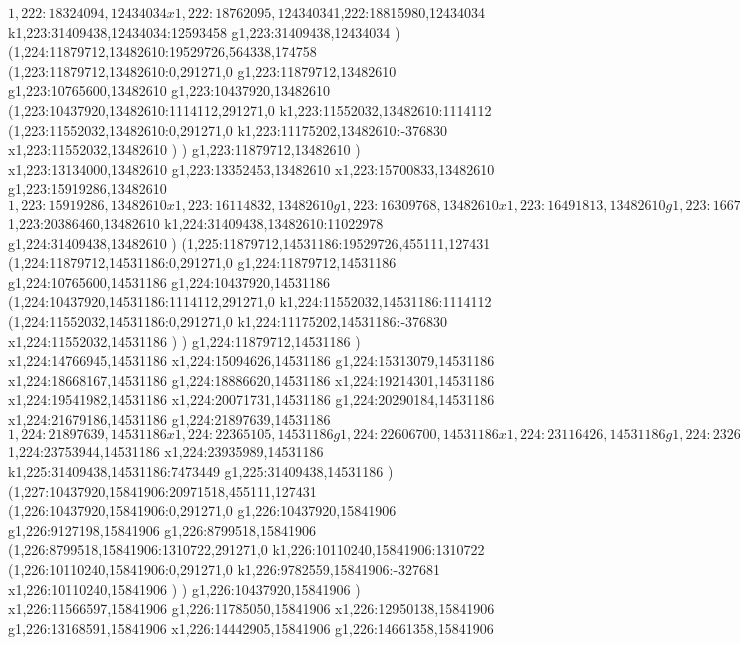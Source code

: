 {$1,222:18324094,12434034
x1,222:18762095,12434034
$1,222:18815980,12434034
k1,223:31409438,12434034:12593458
g1,223:31409438,12434034
)
(1,224:11879712,13482610:19529726,564338,174758
(1,223:11879712,13482610:0,291271,0
g1,223:11879712,13482610
g1,223:10765600,13482610
g1,223:10437920,13482610
(1,223:10437920,13482610:1114112,291271,0
k1,223:11552032,13482610:1114112
(1,223:11552032,13482610:0,291271,0
k1,223:11175202,13482610:-376830
x1,223:11552032,13482610
)
)
g1,223:11879712,13482610
)
x1,223:13134000,13482610
g1,223:13352453,13482610
x1,223:15700833,13482610
g1,223:15919286,13482610
$1,223:15919286,13482610
x1,223:16114832,13482610
g1,223:16309768,13482610
x1,223:16491813,13482610
g1,223:16673853,13482610
x1,223:17111854,13482610
g1,223:17311371,13482610
x1,223:17821097,13482610
g1,223:17966729,13482610
x1,223:18404730,13482610
g1,223:18640655,13482610
x1,223:19296016,13482610
g1,223:19478056,13482610
x1,223:19951372,13482610
[1,223:19951372,13657368:435088,739096,0
(1,223:19951372,13202262:435088,283990,54614
x1,223:20353692,13202262
)
(1,223:19951372,13657368:294003,295640,0
x1,223:20212607,13657368
)
]
$1,223:20386460,13482610
k1,224:31409438,13482610:11022978
g1,224:31409438,13482610
)
(1,225:11879712,14531186:19529726,455111,127431
(1,224:11879712,14531186:0,291271,0
g1,224:11879712,14531186
g1,224:10765600,14531186
g1,224:10437920,14531186
(1,224:10437920,14531186:1114112,291271,0
k1,224:11552032,14531186:1114112
(1,224:11552032,14531186:0,291271,0
k1,224:11175202,14531186:-376830
x1,224:11552032,14531186
)
)
g1,224:11879712,14531186
)
x1,224:14766945,14531186
x1,224:15094626,14531186
g1,224:15313079,14531186
x1,224:18668167,14531186
g1,224:18886620,14531186
x1,224:19214301,14531186
x1,224:19541982,14531186
x1,224:20071731,14531186
g1,224:20290184,14531186
x1,224:21679186,14531186
g1,224:21897639,14531186
$1,224:21897639,14531186
x1,224:22365105,14531186
g1,224:22606700,14531186
x1,224:23116426,14531186
g1,224:23262058,14531186
x1,224:23700059,14531186
$1,224:23753944,14531186
x1,224:23935989,14531186
k1,225:31409438,14531186:7473449
g1,225:31409438,14531186
)
(1,227:10437920,15841906:20971518,455111,127431
(1,226:10437920,15841906:0,291271,0
g1,226:10437920,15841906
g1,226:9127198,15841906
g1,226:8799518,15841906
(1,226:8799518,15841906:1310722,291271,0
k1,226:10110240,15841906:1310722
(1,226:10110240,15841906:0,291271,0
k1,226:9782559,15841906:-327681
x1,226:10110240,15841906
)
)
g1,226:10437920,15841906
)
x1,226:11566597,15841906
g1,226:11785050,15841906
x1,226:12950138,15841906
g1,226:13168591,15841906
x1,226:14442905,15841906
g1,226:14661358,15841906
}
